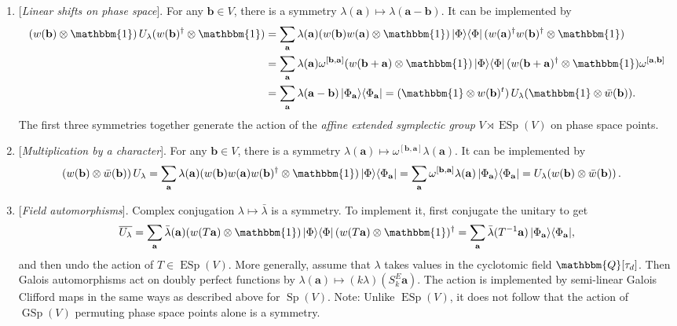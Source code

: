\documentclass[aps,nofootinbib,floatfix,a4paper]{revtex4}
\newcommand{\1}{\mbox{$\mathbf{1}$}}
\def\QQ{\mathbbm{Q}}
\def\Id{\mathbbm{1}}
\DeclareMathOperator{\Sp}{Sp}
\DeclareMathOperator{\GSp}{GSp}
\DeclareMathOperator{\ESp}{ESp}
\renewcommand{\vec}{\mathbf}
\begin{document}
\begin{enumerate}
	\item
		{}[\emph{Linear shifts on phase space}].
		For any $\vec b\in V$, there is a symmetry
		$\lambda(\vec a) \mapsto \lambda(\vec a - \vec b)$.
		It can be implemented by
		\begin{align*}
			(w(\vec b) \otimes \Id) \, U_\lambda (w(\vec b)^\dagger \otimes \Id)
			&=
			\sum_{\vec a}
			\lambda(\vec a) 
			(w(\vec b) w(\vec a) \otimes \Id) 
			\,|\Phi\rangle\langle\Phi|\,
			(w(\vec a)^\dagger w(\vec b)^\dagger \otimes \Id)  \\
			&=
			\sum_{\vec a}
			\lambda(\vec a) 
			\omega^{[\vec b,\vec a]}
			(w(\vec b+\vec a) \otimes \Id) 
			\,|\Phi\rangle\langle\Phi|\,
			(w(\vec b+\vec a)^\dagger \otimes \Id)  
			\omega^{[\vec a,\vec b]}
			\\
			&=
			\sum_{\vec a}
			\lambda(\vec a-\vec b) \, |\Phi_{\vec a}\rangle\langle\Phi_{\vec a}|
			= 
			(\Id\otimes w(\vec b)^t) \, U_\lambda (\Id\otimes \bar w(\vec b))
			.
		\end{align*}
		The first three symmetries together generate the action of the \emph{affine extended symplectic group} 
		$V \rtimes \ESp(V)$ on phase space points.


	\item
		{}[\emph{Multiplication by a character}].
		For any $\vec b\in V$, there is a symmetry
		$\lambda(\vec a) \mapsto \omega^{[\vec b, \vec a]} \lambda(\vec a)$.
		It can be implemented by
		\begin{align*}
			(w(\vec b) \otimes \bar w(\vec b)) \, U_\lambda 
			&=
			\sum_{\vec a}
			\lambda(\vec a) 
			(w(\vec b) w(\vec a) w(\vec b)^\dagger \otimes \Id) \, |\Phi\rangle\langle\Phi_{\vec a}|
		=
			\sum_{\vec a}
			\omega^{[\vec b,\vec a]}
			\lambda(\vec a) \, |\Phi_{\vec a}\rangle\langle\Phi_{\vec a}|
			= 
			 U_\lambda 
			( w(\vec b) \otimes  \bar w(\vec b)) \,
			.
		\end{align*}

	\item\label{itm:field_autos}
		{}[\emph{Field automorphisms}].
		Complex conjugation
		$\lambda \mapsto \bar \lambda$
		is a symmetry.
		To implement it, first conjugate the unitary to get
		\begin{align*}
			\overline{U_\lambda}
			=
			\sum_{\vec a}
			\bar\lambda(\vec a) 
			(w(T \vec a) \otimes \Id) 
			\, |\Phi\rangle\langle\Phi| \,
			(w(T \vec a) \otimes \Id)^\dagger
			=
			\sum_{\vec a}
			\bar\lambda(T^{-1}\vec a) 
			\, |\Phi_{\vec a}\rangle\langle\Phi_{\vec a}|,
		\end{align*}
		and then undo the action of $T\in\ESp(V)$.
		More generally, assume that $\lambda$ takes values in the cyclotomic field $\QQ[\tau_d]$.
		Then Galois automorphisms act on doubly perfect functions by
		$\lambda(\vec a) \mapsto (k \lambda)(S^E_k \vec a)$.
		The action is implemented by semi-linear Galois Clifford maps in the same ways as described above for $\Sp(V)$.
		Note:
		Unlike $\ESp(V)$, it does not follow that the action of $\GSp(V)$ permuting phase space points alone is a symmetry.


\end{enumerate}
\end{document}
